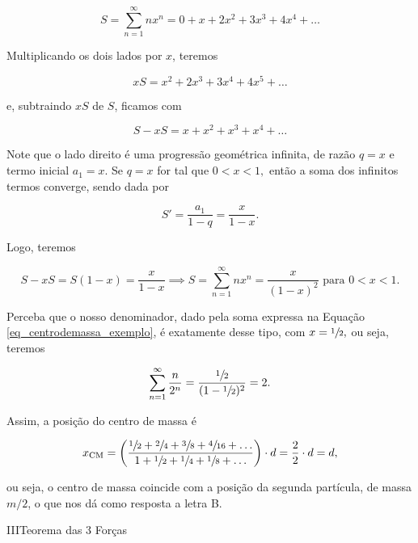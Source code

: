 \begin{exemplo}
$$ S =  \sum_{n=1}^{\infty} nx^n  = 0 + x + 2x^2 + 3x^3+4x^4 + \dots$$

Multiplicando os dois lados por $x$, teremos

$$ xS = x^2 + 2x^3 + 3x^4 + 4x^5 + \dots$$

\noindent e, subtraindo $xS$ de $S$, ficamos com

$$   S - xS = x + x^2 + x^3+ x^4 +  \dots $$

Note que o lado direito é uma progressão geométrica infinita, de razão $q=x$ e termo inicial $a_1=x$. Se $q=x$ for tal que $0<x<1,$ então a soma dos infinitos termos converge, sendo dada por

$$ S'= \dfrac{a_1}{1-q} = \dfrac{x}{1-x}.$$

Logo, teremos 

$$ S-xS = S(1-x) = \dfrac{x}{1-x} \implies \boxed{S =  \sum_{n=1}^{\infty} nx^n =\dfrac{x}{(1-x)^2} \text{ para } 0<x<1.}$$

Perceba que o nosso denominador, dado pela soma expressa na Equação \eqref{eq_centrodemassa_exemplo}, é exatamente desse tipo, com $x=\sfrac{1}{2},$ ou seja, teremos  

$$  \sum_{n=1}^{\infty} \dfrac{n}{2^n} = \dfrac{\sfrac{1}{2}}{(1-\sfrac{1}{2})^2} = 2.$$

Assim, a posição do centro de massa é

$$ x_\text{CM} = \left( \dfrac{\sfrac{1}{2} + \sfrac{2}{4} + \sfrac{3}{8} + \sfrac{4}{16} + \dots }{1 + \sfrac{1}{2} +  \sfrac{1}{4} +  \sfrac{1}{8} + \dots }  \right) \cdot d  = \dfrac{2}{2} \cdot d = d,$$

\noindent ou seja, o centro de massa coincide com a posição da segunda partícula, de massa $m/2$, o que nos dá como resposta a letra B.

\end{exemplo}



\vspace{0.3cm}


















\begin{secnivel}{III}{Teorema das 3 Forças}
 

  

\end{secnivel}







